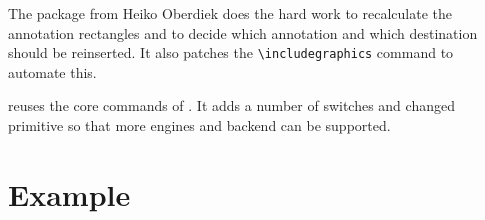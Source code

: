 \documentclass[DIV=12,parskip=half-,bibliography=totoc]{scrartcl}
\begin{document}
The  package from Heiko Oberdiek does the hard work to recalculate the annotation rectangles and to decide which annotation and which destination should be reinserted. It also patches the \verb+\includegraphics+ command to automate this.

 reuses the core commands of . It adds a number of switches and changed primitive so that more engines and backend can be supported.


\section{Example}

\end{document}
